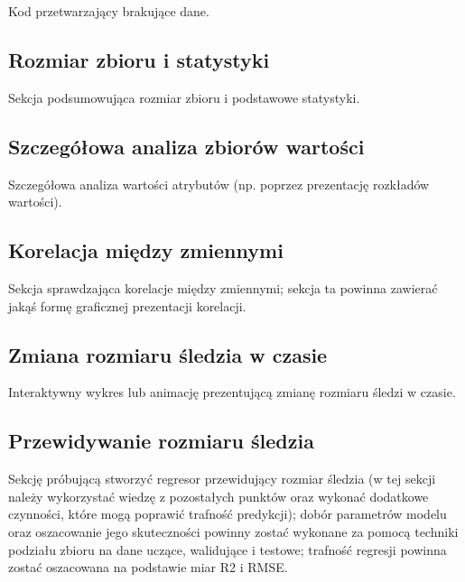\documentclass[]{article}
\begin{document}
Kod przetwarzający brakujące dane.

\hypertarget{rozmiar-zbioru-i-statystyki}{%
\subsection{Rozmiar zbioru i statystyki
}\label{rozmiar-zbioru-i-statystyki}}

Sekcja podsumowująca rozmiar zbioru i podstawowe statystyki.

\hypertarget{szczeguxf3ux142owa-analiza-zbioruxf3w-wartoux15bci}{%
\subsection{Szczegółowa analiza zbiorów wartości
}\label{szczeguxf3ux142owa-analiza-zbioruxf3w-wartoux15bci}}

Szczegółowa analiza wartości atrybutów (np. poprzez prezentację
rozkładów wartości).

\hypertarget{korelacja-miux119dzy-zmiennymi}{%
\subsection{Korelacja między zmiennymi
}\label{korelacja-miux119dzy-zmiennymi}}

Sekcja sprawdzająca korelacje między zmiennymi; sekcja ta powinna
zawierać jakąś formę graficznej prezentacji korelacji.

\hypertarget{zmiana-rozmiaru-ux15bledzia-w-czasie}{%
\subsection{Zmiana rozmiaru śledzia w czasie
}\label{zmiana-rozmiaru-ux15bledzia-w-czasie}}

Interaktywny wykres lub animację prezentującą zmianę rozmiaru śledzi w
czasie.

\hypertarget{przewidywanie-rozmiaru-ux15bledzia}{%
\subsection{Przewidywanie rozmiaru śledzia
}\label{przewidywanie-rozmiaru-ux15bledzia}}

Sekcję próbującą stworzyć regresor przewidujący rozmiar śledzia (w tej
sekcji należy wykorzystać wiedzę z pozostałych punktów oraz wykonać
dodatkowe czynności, które mogą poprawić trafność predykcji); dobór
parametrów modelu oraz oszacowanie jego skuteczności powinny zostać
wykonane za pomocą techniki podziału zbioru na dane uczące, walidujące i
testowe; trafność regresji powinna zostać oszacowana na podstawie miar
R2 i RMSE.
\end{document}
